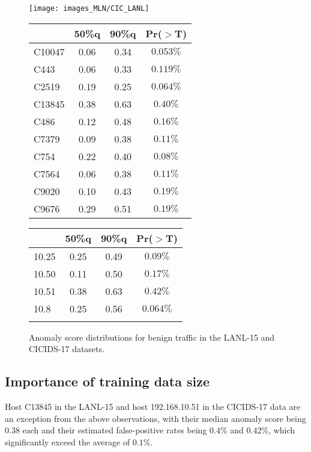 \begin{figure}%
    \begin{center}
\texttt{[image: images\_MLN/CIC\_LANL]} 
\begin{tabular}{l|ccc}
  \hline &  50\%q  &  90\%q  & Pr($>$T) \\ 
  \hline
C10047 & 0.06 & 0.34 & $0.053\%$ \\ 
  C443 & 0.06 & 0.33 &  $0.119\%$ \\ 
  C2519 & 0.19 & 0.25 & $0.064\%$ \\ 
  C13845 & 0.38 & 0.63 & $0.40\%$ \\ 
  C486 & 0.12 & 0.48 & $0.16\%$ \\ 
  C7379 & 0.09 & 0.38 & $0.11\%$ \\ 
  C754 & 0.22 & 0.40 &  $0.08\%$ \\ 
  C7564 & 0.06 & 0.38 & $0.11\%$ \\ 
  C9020 & 0.10 & 0.43 & $0.19\%$ \\ 
  C9676 & 0.29 & 0.51 & $0.19\%$ \\ 
   \hline
\end{tabular}
\quad
\begin{tabular}{l|ccc}
  \hline
 &  50\%q  &  90\%q  &  Pr($>$T) \\ 
  \hline
10.25 & 0.25 & 0.49 &  $0.09\%$ \\ 
10.50 & 0.11 & 0.50  & $0.17\%$ \\ 
10.51 & 0.38 & 0.63  & $0.42\%$ \\ 
10.8 & 0.25 & 0.56 & $0.064\%$ \\ 
   \hline
\multicolumn{2}{c}{}
\vspace{2.1cm}
\end{tabular}
\end{center}
\caption{Anomaly score distributions for benign traffic in the LANL-15 and CICIDS-17 datasets.%
}\label{fig:CICrealresults}
\end{figure}


\subsection{Importance of training data size}


Host C13845 in the LANL-15 and host 192.168.10.51 in the CICIDS-17 data are an exception from the above observations, with their median anomaly score being $0.38$ each and their estimated false-positive rates being $0.4\%$ and $0.42\%$, which significantly exceed the average of $0.1\%$. 

